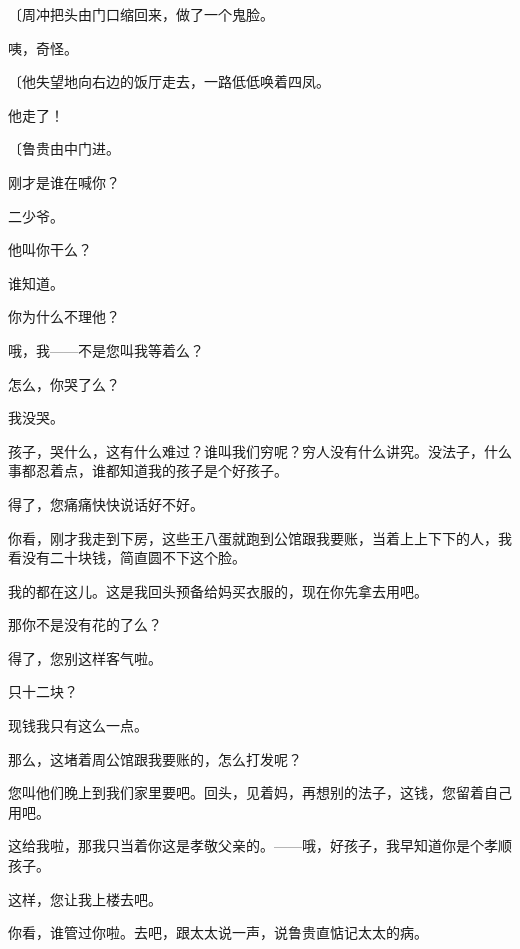 {\fangsong〔周冲把头由门口缩回来，做了一个鬼脸。}

咦，奇怪。

{\fangsong〔他失望地向右边的饭厅走去，一路低低唤着四凤。}

他走了！

{\fangsong〔鲁贵由中门进。}

刚才是谁在喊你？

二少爷。

他叫你干么？

谁知道。

你为什么不理他？

哦，我——不是您叫我等着么？

怎么，你哭了么？

我没哭。

孩子，哭什么，这有什么难过？谁叫我们穷呢？穷人没有什么讲究。没法子，什么事都忍着点，谁都知道我的孩子是个好孩子。

得了，您痛痛快快说话好不好。

你看，刚才我走到下房，这些王八蛋就跑到公馆跟我要账，当着上上下下的人，我看没有二十块钱，简直圆不下这个脸。

我的都在这儿。这是我回头预备给妈买衣服的，现在你先拿去用吧。

那你不是没有花的了么？

得了，您别这样客气啦。

只十二块？

现钱我只有这么一点。

那么，这堵着周公馆跟我要账的，怎么打发呢？

您叫他们晚上到我们家里要吧。回头，见着妈，再想别的法子，这钱，您留着自己用吧。

这给我啦，那我只当着你这是孝敬父亲的。——哦，好孩子，我早知道你是个孝顺孩子。

这样，您让我上楼去吧。

你看，谁管过你啦。去吧，跟太太说一声，说鲁贵直惦记太太的病。

